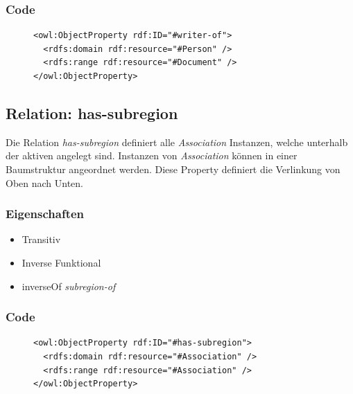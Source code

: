 \documentclass[
    11pt,
    latin1,
    a4paper,
    oneside
]{scrreprt}
\begin{document}
\subsubsection{Code} \label{sec:rel_writerof_code}

\begin{figure}[H]
 \lstset{language=XML}
 \begin{lstlisting}[label=owl:writerof,caption={Die Relation \emph{writer-of} gibt an, welche \emph{Person} an welchem \emph{Document} gearbeitet hat}]
<owl:ObjectProperty rdf:ID="#writer-of">
  <rdfs:domain rdf:resource="#Person" />
  <rdfs:range rdf:resource="#Document" />
</owl:ObjectProperty>
 \end{lstlisting}
\end{figure}


\subsection{Relation: has-subregion} \label{sec:rel_hassubregion}

Die Relation \emph{has-subregion} definiert alle \emph{Association} Instanzen, welche unterhalb der aktiven angelegt sind. Instanzen von \emph{Association} k\"onnen in einer Baumstruktur angeordnet werden. Diese Property definiert die Verlinkung von Oben nach Unten.

\subsubsection{Eigenschaften} \label{sec:rel_hassubregion_settings}

\begin{itemize}
  \item Transitiv
  \item Inverse Funktional
  \item inverseOf \emph{subregion-of}
\end{itemize}

\subsubsection{Code} \label{sec:rel_hassubregion_code}

\begin{figure}[H]
 \lstset{language=XML}
 \begin{lstlisting}[label=owl:hassubregion,caption={Die Relation \emph{has-subregion} definiert, welche Untersektionen eine \emph{Association} hat}]
<owl:ObjectProperty rdf:ID="#has-subregion">
  <rdfs:domain rdf:resource="#Association" />
  <rdfs:range rdf:resource="#Association" />
</owl:ObjectProperty>
 \end{lstlisting}
\end{figure}
\end{document}
